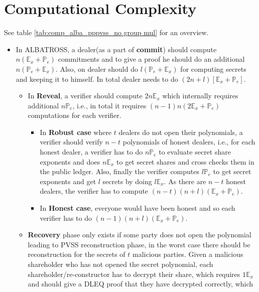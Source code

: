 \section{Computational Complexity}

See table \ref{tab:comp_alba_pppvss_no group mul} for an overview.
\begin{itemize}
    \item In ALBATROSS, a dealer(as a part of \textbf{commit}) should compute $n(\mathbb{E}_x+\mathbb{P}_e)$ commitments and to give a proof he should do an additional $n(\mathbb{P}_{e}+\mathbb{E}_{x})$. Also, on dealer should do $l(\mathbb{P}_e+\mathbb{E}_x)$ for computing secrets and keeping it to himself. In total dealer needs to do $(2n+l)[\mathbb{E}_x+\mathbb{P}_{e}]$.
        \begin{itemize}
            \item In \textbf{Reveal}, a verifier should compute $2n\mathbb{E}_{x}$ which internally requires additional $n\mathbb{P}_{e}$, i.e., in total it requires $(n-1)n(2\mathbb{E}_{x}+\mathbb{P}_{e})$ computations for each verifier.
            \begin{itemize}
                \item In \textbf{Robust case} where $t$ dealers do not open their polynomials, a verifier should verify $n-t$ polynomials of honest dealers, i.e., for each honest dealer, a verifier has to do $n\mathbb{P}_e$ to evaluate secret share exponents and does $n\mathbb{E}_x$ to get secret shares and cross checks them in the public ledger. Also, finally the verifier computes $l\mathbb{P}_e$ to get secret exponents and get $l$ secrets by doing $l\mathbb{E}_x$. As there are $n-t$ honest dealers, the verifier has to compute $(n-t)(n+l)(\mathbb{E}_x+\mathbb{P}_e)$.
                \item  In \textbf{Honest case}, everyone would have been honest and so each verifier has to do $(n-1)(n+l)(\mathbb{E}_x+\mathbb{P}_e)$.
            \end{itemize}
            \item \textbf{Recovery} phase only exists if some party does not 
            open the polynomial leading to PVSS reconstruction phase, in the 
            worst case there should be reconstruction for the secrets of $t$ 
            malicious parties. Given a malicious shareholder who has not opened 
            the secret polynomial, each shareholder/re-constructor has to 
            decrypt their share, which requires $1\mathbb{E}_{x}$ and should 
            give a DLEQ proof that they have decrypted correctly, which 

\end{itemize}
\end{itemize}
